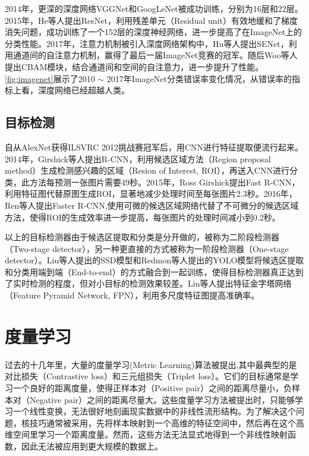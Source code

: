 2014年，更深的深度网络VGGNet\cite{simonyan2014very}和GoogLeNet\cite{szegedy2015going}被成功训练，分别为16层和22层。2015年，He等人提出ResNet\cite{he2016deep}，利用残差单元（Residual unit）有效地缓和了梯度消失问题，成功训练了一个152层的深度神经网络，进一步提高了在ImageNet上的分类性能。2017年，注意力机制被引入深度网络架构中，Hu等人提出SENet\cite{hu2018squeeze}，利用通道间的自注意力机制，赢得了最后一届ImageNet竞赛的冠军。随后Woo等人提出CBAM模块\cite{woo2018cbam}，结合通道间和空间的自注意力，进一步提升了性能。\autoref{fig:imagenet}展示了2010 $\sim$ 2017年ImageNet分类错误率变化情况，从错误率的指标上看，深度网络已经超越人类。

\subsection{目标检测}

自从AlexNet获得ILSVRC 2012挑战赛冠军后，用CNN进行特征提取便流行起来。2014年，Girshick等人提出R-CNN\cite{girshick2014rich}，利用候选区域方法（Region proposal method）生成检测感兴趣的区域（Resion of Interest, ROI），再送入CNN进行分类，此方法每预测一张图片需要49秒。2015年，Ross Girshick提出Fast R-CNN\cite{girshick2015fast}，利用特征图代替原图生成ROI，显著地减少处理时间至每张图片2.3秒。2016年，Ren等人提出Faster R-CNN\cite{ren2015faster},使用可微的候选区域网络代替了不可微分的候选区域方法，使得ROI的生成效率进一步提高，每张图片的处理时间减小到0.2秒。

以上的目标检测器由于候选区提取和分类是分开做的，被称为二阶段检测器（Two-stage detector），另一种更直接的方式被称为一阶段检测器（One-stage detector）。Liu等人提出的SSD模型\cite{liu2016ssd}和Redmon等人提出的YOLO模型\cite{redmon2016you, redmon2017yolo9000, redmon2018yolov3}将候选区提取和分类用端到端（End-to-end）的方式融合到一起训练，使得目标检测器真正达到了实时检测的程度，但对小目标的检测效果较差。Lin等人提出特征金字塔网络（Feature Pyramid Network, FPN）\cite{lin2017feature}，利用多尺度特征图提高准确率。

\section{度量学习}

过去的十几年里，大量的度量学习(Metric Learning)算法被提出,其中最典型的是对比损失（Contrastive loss）\cite{chopra2005learning, hadsell2006dimensionality}和三元组损失（Triplet loss）\cite{weinberger2009distance, chechik2010large}。它们的目标通常是学习一个良好的距离度量，使得正样本对（Positive pair）之间的距离尽量小，负样本对（Negative pair）之间的距离尽量大。这些度量学习方法被提出时，只能够学习一个线性变换，无法很好地刻画现实数据中的非线性流形结构。为了解决这个问题，核技巧通常被采用，先将样本映射到一个高维的特征空间中，然后再在这个高维空间里学习一个距离度量\cite{tsang2003distance, yeung2007kernel}。然而，这些方法无法显式地得到一个非线性映射函数，因此无法被应用到更大规模的数据上。

